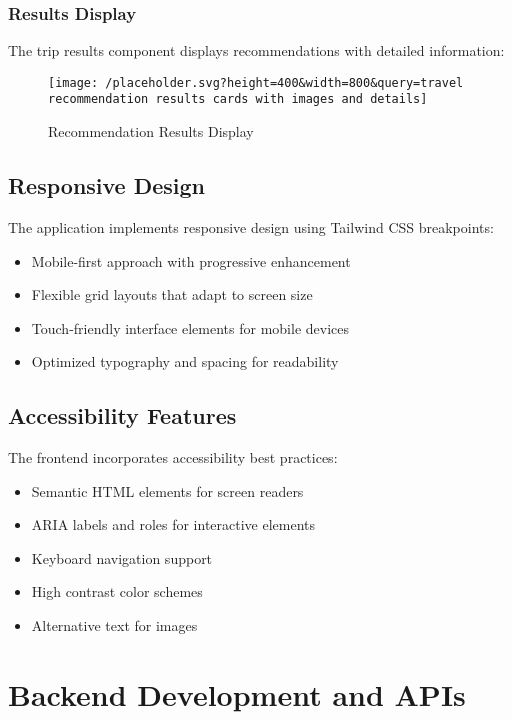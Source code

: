\documentclass[12pt,a4paper]{article}
\begin{document}
\subsubsection{Results Display}
The trip results component displays recommendations with detailed information:

\begin{figure}[H]
    \centering
    \texttt{[image: /placeholder.svg?height=400\&width=800\&query=travel recommendation results cards with images and details]}
    \caption{Recommendation Results Display}
    \label{fig:results}
\end{figure}

\subsection{Responsive Design}
The application implements responsive design using Tailwind CSS breakpoints:
\begin{itemize}
    \item Mobile-first approach with progressive enhancement
    \item Flexible grid layouts that adapt to screen size
    \item Touch-friendly interface elements for mobile devices
    \item Optimized typography and spacing for readability
\end{itemize}

\subsection{Accessibility Features}
The frontend incorporates accessibility best practices:
\begin{itemize}
    \item Semantic HTML elements for screen readers
    \item ARIA labels and roles for interactive elements
    \item Keyboard navigation support
    \item High contrast color schemes
    \item Alternative text for images
\end{itemize}

\newpage

\section{Backend Development and APIs}
\end{document}
